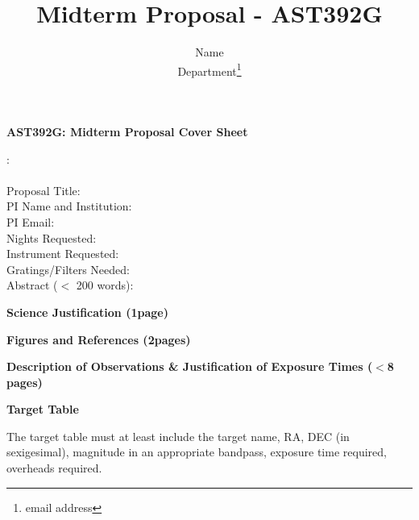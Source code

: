 \documentclass[11pt]{article}
\title{Midterm Proposal - AST392G}
\author{ Name\\  Department\thanks{email address} }
\begin{document}
\begin{center} {\bf \large AST392G: Midterm Proposal Cover Sheet} \end{center}: \\ \\


Proposal Title:  \\

PI Name and Institution:  \\

PI Email:  \\

Nights Requested:  \\

Instrument Requested:  \\

Gratings/Filters Needed:  \\

Abstract ($<$ 200 words):  \\

\pagebreak



\begin{center}{\bf Science Justification (1page)}\end{center}

\newpage
\begin{center}{\bf Figures  and References (2pages) }\end{center}

\newpage
\begin{center}{\bf Description of Observations \& Justification of Exposure Times ($<$8 pages)}
\end{center}

\newpage
\begin{center}{\bf Target Table}\end{center}
The target table must at least include the target name, RA, DEC (in sexigesimal), magnitude in an appropriate bandpass, exposure time required, overheads required.
\end{document}
